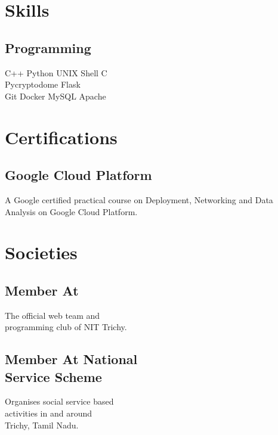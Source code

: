 \documentclass[]{deedy-resume-openfont}
\begin{document}
\begin{minipage}[t]{0.33\textwidth}
\section{Skills}
\subsection{Programming}
C++ \textbullet{} Python \textbullet{} UNIX Shell \textbullet{} C \\
Pycryptodome \textbullet{} Flask \\
Git \textbullet{} Docker \textbullet{} MySQL \textbullet{} Apache
\sectionsep


\section{Certifications}
\subsection{Google Cloud Platform}
A Google certified practical course on
Deployment, Networking and Data Analysis
on Google Cloud Platform.\newline
{}
\sectionsep


\section{Societies}
\subsection{Member At}
The official web team and \\
programming club of NIT Trichy.\newline
\subsection{Member At National \\
Service Scheme}
Organises social service based \\
activities in and around \\
Trichy, Tamil Nadu.
\sectionsep

%
%

\end{minipage} 
\end{document}
